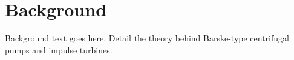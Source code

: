 \section{Background}
Background text goes here. Detail the theory behind Barske-type centrifugal pumps and impulse turbines.
